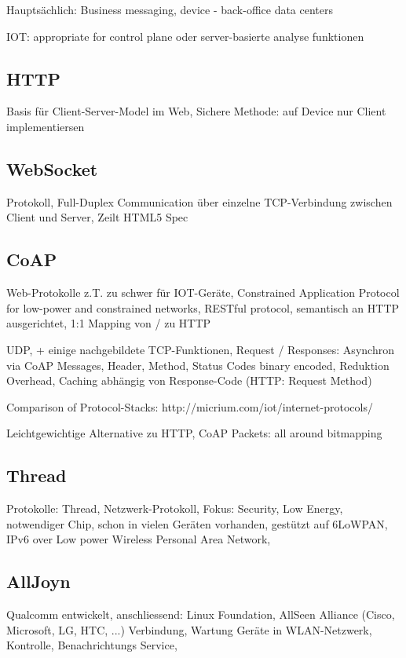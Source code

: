 Hauptsächlich: Business messaging, device - back-office data centers

IOT: appropriate for control plane oder server-basierte analyse funktionen

\subsection{HTTP}
Basis für Client-Server-Model im Web, Sichere Methode: auf Device nur Client implementiersen

\subsection{WebSocket}
Protokoll, Full-Duplex Communication über einzelne TCP-Verbindung zwischen Client und Server, Zeilt HTML5 Spec

\subsection{CoAP}
Web-Protokolle z.T. zu schwer für IOT-Geräte, Constrained Application Protocol for low-power and constrained networks, RESTful protocol, semantisch an HTTP ausgerichtet, 1:1 Mapping von / zu HTTP

UDP, + einige nachgebildete TCP-Funktionen, Request / Responses: Asynchron via CoAP Messages, Header, Method, Status Codes binary encoded, Reduktion Overhead, Caching abhängig von Response-Code (HTTP: Request Method)

Comparison of Protocol-Stacks: http://micrium.com/iot/internet-protocols/

Leichtgewichtige Alternative zu HTTP, CoAP Packets: all around bitmapping

\subsection{Thread}
Protokolle: Thread, Netzwerk-Protokoll, Fokus: Security, Low Energy, notwendiger Chip, schon in vielen Geräten vorhanden, gestützt auf 6LoWPAN, IPv6 over Low power Wireless Personal Area Network, 


\subsection{AllJoyn}
Qualcomm entwickelt, anschliessend: Linux Foundation, AllSeen Alliance (Cisco, Microsoft, LG, HTC, ...)
Verbindung, Wartung Geräte in WLAN-Netzwerk, Kontrolle, Benachrichtungs Service, 

